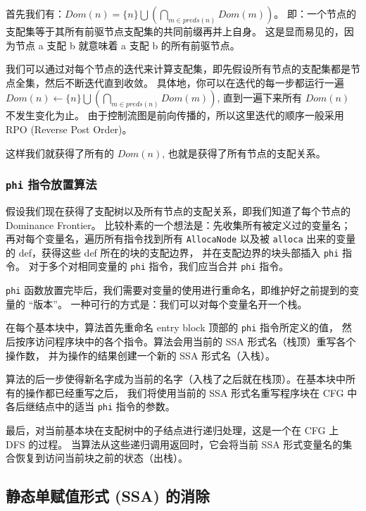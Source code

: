 首先我们有：$\mathit{Dom}(n) = \{n\} \bigcup \left(\bigcap_{m\in \mathit{preds}(n)} \mathit{Dom}(m)\right)$。
即：一个节点的支配集等于其所有前驱节点支配集的共同前缀再并上自身。
这是显而易见的，因为节点 a 支配 b 就意味着 a 支配 b 的所有前驱节点。

我们可以通过对每个节点的迭代来计算支配集，即先假设所有节点的支配集都是节点全集，然后不断迭代直到收敛。
具体地，你可以在迭代的每一步都运行一遍 $\mathit{Dom}(n) \leftarrow \{n\} \bigcup
\left(\bigcap_{m\in \mathit{preds}(n)} \mathit{Dom}(m)\right)$,
直到一遍下来所有 $\mathit{Dom}(n)$ 不发生变化为止。
由于控制流图是前向传播的，所以这里迭代的顺序一般采用 RPO (Reverse Post Order)。

这样我们就获得了所有的 $\mathit{Dom}(n)$, 也就是获得了所有节点的支配关系。

\subsubsection{\texttt{phi} 指令放置算法}

假设我们现在获得了支配树以及所有节点的支配关系，即我们知道了每个节点的 Dominance Frontier。
比较朴素的一个想法是：先收集所有被定义过的变量名；再对每个变量名，遍历所有指令找到所有 \texttt{AllocaNode}
以及被 \texttt{alloca} 出来的变量的 def，获得这些 def 所在的块的支配边界，
并在支配边界的块头部插入 \texttt{phi} 指令。
对于多个对相同变量的 \texttt{phi} 指令，我们应当合并 \texttt{phi} 指令。

\texttt{phi} 函数放置完毕后，我们需要对变量的使用进行重命名，即维护好之前提到的变量的 “版本”。
一种可行的方式是：我们可以对每个变量名开一个栈。

在每个基本块中，算法首先重命名 entry block 顶部的 \texttt{phi} 指令所定义的值，
然后按序访问程序块中的各个指令。算法会用当前的 SSA 形式名（栈顶）重写各个操作数，
并为操作的结果创建一个新的 SSA 形式名（入栈）。

算法的后一步使得新名字成为当前的名字（入栈了之后就在栈顶）。在基本块中所有的操作都已经重写之后，
我们将使用当前的 SSA 形式名重写程序块在 CFG 中各后继结点中的适当 \texttt{phi} 指令的参数。

最后，对当前基本块在支配树中的子结点进行递归处理，这是一个在 CFG 上 DFS 的过程。
当算法从这些递归调用返回时，它会将当前 SSA 形式变量名的集合恢复到访问当前块之前的状态（出栈）。

\subsection{静态单赋值形式 (SSA) 的消除}

